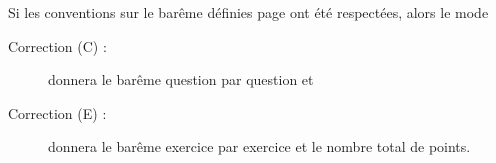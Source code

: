 \begin{dsxl}
 Si les conventions sur le barême définies page \pageref{convention bareme question} ont été respectées, alors le mode 
 \begin{description}
  \item[ Correction (C) : ] donnera le barême question par question et
  \item[ Correction (E) : ] donnera le barême exercice par exercice et le nombre total de points. 
 \end{description}

\end{dsxl}


 
 
